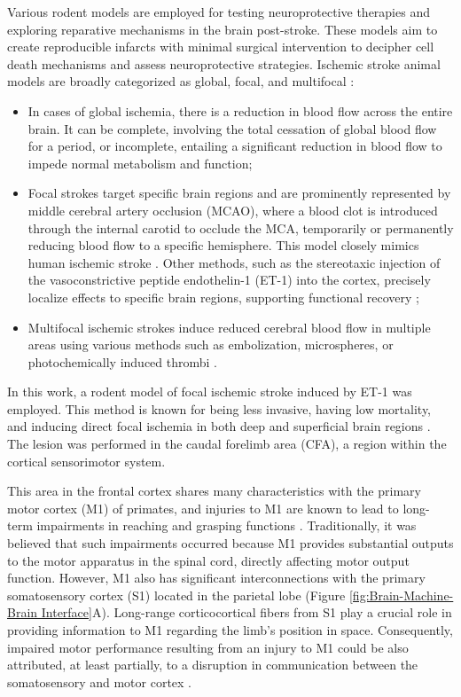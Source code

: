 Various rodent models are employed for testing neuroprotective therapies and exploring reparative mechanisms in the brain post-stroke. These models aim to create reproducible infarcts with minimal surgical intervention to decipher cell death mechanisms and assess neuroprotective strategies. Ischemic stroke animal models are broadly categorized as global, focal, and multifocal \cite{Graham2004}:
\begin{itemize}
    \item In cases of global ischemia, there is a reduction in blood flow across the entire brain. It can be complete, involving the total cessation of global blood flow for a period, or incomplete, entailing a significant reduction in blood flow to impede normal metabolism and function;
    \item Focal strokes target specific brain regions and are prominently represented by middle cerebral artery occlusion (MCAO), where a blood clot is introduced through the internal carotid to occlude the MCA, temporarily or permanently reducing blood flow to a specific hemisphere. This model closely mimics human ischemic stroke \cite{Garcia1993,Tsuji2013,Zhang2013}. Other methods, such as the stereotaxic injection of the vasoconstrictive peptide endothelin-1 (ET-1) into the cortex, precisely localize effects to specific brain regions, supporting functional recovery \cite{Frost2006,Fang2010};
    \item Multifocal ischemic strokes induce reduced cerebral blood flow in multiple areas using various methods such as embolization, microspheres, or photochemically induced thrombi \cite{McAuley1995,Traystman2003}.
\end{itemize}

In this work, a rodent model of focal ischemic stroke induced by ET-1 was employed. This method is known for being less invasive, having low mortality, and inducing direct focal ischemia in both deep and superficial brain regions \cite{Sharkey1993}. The lesion was performed in the caudal forelimb area (CFA), a region within the cortical sensorimotor system. 

This area in the frontal cortex shares many characteristics with the primary motor cortex (M1) of primates, and injuries to M1 are known to lead to long-term impairments in reaching and grasping functions \cite{Nishibe2010}. Traditionally, it was believed that such impairments occurred because M1 provides substantial outputs to the motor apparatus in the spinal cord, directly affecting motor output function. However, M1 also has significant interconnections with the primary somatosensory cortex (S1) located in the parietal lobe (Figure \ref{fig:Brain-Machine-Brain Interface}A). Long-range corticocortical fibers from S1 play a crucial role in providing information to M1 regarding the limb's position in space. Consequently, impaired motor performance resulting from an injury to M1 could be also attributed, at least partially, to a disruption in communication between the somatosensory and motor cortex \cite{Friel2005}.

